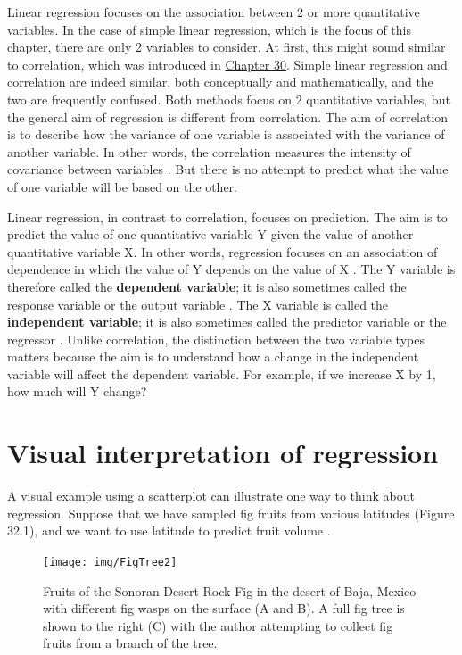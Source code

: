 \documentclass[
  openany]{krantz}
\begin{document}
Linear regression focuses on the association between 2 or more quantitative variables.
In the case of simple linear regression, which is the focus of this chapter, there are only 2 variables to consider.
At first, this might sound similar to correlation, which was introduced in \protect\hyperlink{Chapter_30}{Chapter 30}.
Simple linear regression and correlation are indeed similar, both conceptually and mathematically, and the two are frequently confused.
Both methods focus on 2 quantitative variables, but the general aim of regression is different from correlation.
The aim of correlation is to describe how the variance of one variable is associated with the variance of another variable.
In other words, the correlation measures the intensity of covariance between variables \citep{Sokal1995}.
But there is no attempt to predict what the value of one variable will be based on the other.

Linear regression, in contrast to correlation, focuses on prediction.
The aim is to predict the value of one quantitative variable Y given the value of another quantitative variable X.
In other words, regression focuses on an association of dependence in which the value of Y depends on the value of X \citep{Rahman1968}.
The Y variable is therefore called the \textbf{dependent variable}; it is also sometimes called the response variable or the output variable \citep{Box1978, Sokal1995}.
The X variable is called the \textbf{independent variable}; it is also sometimes called the predictor variable or the regressor \citep{Box1978, Sokal1995}.
Unlike correlation, the distinction between the two variable types matters because the aim is to understand how a change in the independent variable will affect the dependent variable.
For example, if we increase X by 1, how much will Y change?

\hypertarget{visual-interpretation-of-regression}{%
\section{Visual interpretation of regression}\label{visual-interpretation-of-regression}}

A visual example using a scatterplot can illustrate one way to think about regression.
Suppose that we have sampled fig fruits from various latitudes (Figure 32.1), and we want to use latitude to predict fruit volume \citep{Duthie2016}.

\begin{figure}
\texttt{[image: img/FigTree2]} \caption{Fruits of the Sonoran Desert Rock Fig in the desert of Baja, Mexico with different fig wasps on the surface (A and B). A full fig tree is shown to the right (C) with the author attempting to collect fig fruits from a branch of the tree.}\label{fig:unnamed-chunk-139}
\end{figure}
\end{document}
